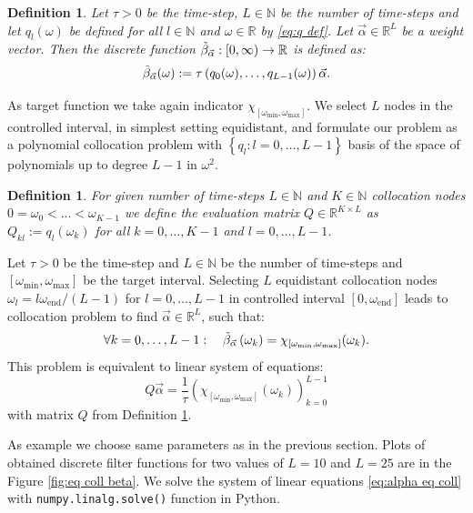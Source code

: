 \documentclass[a4paper,11pt,bibliography=totoc,listof=totoc,headinclude=true,cleardoublepage=empty,oneside]{scrbook}
\newtheorem{definition}[theorem]{Definition}
\newcommand{\R}{\mathbb{R}}
\newcommand{\N}{\mathbb{N}}
\newcommand{\dffv}{\Tilde{\beta}_{\Vec{\alpha}}}
\newcommand{\e}{\mathrm{end}}
\begin{document}
\begin{definition}
    Let $\tau > 0$ be the time-step, $L\in \N$ be the number of time-steps and let $q_l(\omega)$ be defined for all $l \in \N$ and $\omega \in \R$ by \eqref{eq:q def}. Let $\Vec{\alpha}\in\R^L$ be a weight vector. Then the discrete function $\dffv: [0, \infty) \rightarrow \R$ is defined as:
    \begin{equation*}\label{eq:dffv}
        \dffv (\omega) := \tau \left(q_0(\omega), \dots, q_{L-1}(\omega)\right) \Vec{\alpha}. 
    \end{equation*}
\end{definition}

As target function we take again indicator $\chi_{\left[\omega_{\min}, \omega_{\max}\right]}$. We select $L$ nodes in the controlled interval, in simplest setting equidistant, and formulate our problem as a polynomial collocation problem with $\left\{q_l : l=0, \dots, L-1\right\}$ basis of the space of polynomials up to degree $L-1$ in $\omega^2$.
\begin{definition}\label{def:evaluation matrix}
    For given number of time-steps $L\in \N$ and $K\in \N$ collocation nodes $ 0 = \omega_0 < \dots < \omega_{K-1}$ we define the evaluation matrix $Q \in \R^{K\times L}$ as $Q_{kl} := q_l\left(\omega_k\right)$ for all $k=0, \dots, K-1$ and $l=0, \dots, L-1$. 
\end{definition}

Let $\tau>0$ be the time-step and $L\in \N$ be the number of time-steps and $\left[\omega_{\min}, \omega_{\max}\right]$ be the target interval. Selecting $L$ equidistant collocation nodes $\omega_l = l\omega_\e/ (L-1)$ for $l=0, \dots, L-1$ in controlled interval $\left[0, \omega_{\e}\right]$ leads to collocation problem to find $\Vec{\alpha} \in \R^L$, such that:
\begin{equation*}
    \forall k = 0, \dots, L-1: \quad \dffv\left(\omega_k\right) = \chi_{\left[\omega_{\min}, \omega_{\max}\right]}(\omega_k).
\end{equation*}
This problem is equivalent to linear system of equations:
\begin{equation}\label{eq:alpha eq coll}
     Q \Vec{\alpha} = \frac{1}{\tau} \left(\chi_{\left[\omega_{\min}, \omega_{\max}\right]}(\omega_k) \right)_{k=0}^{L-1}
\end{equation}
with matrix $Q$ from Definition \ref{def:evaluation matrix}.

As example we choose same parameters as in the previous section. Plots of obtained discrete filter functions for two values of $L = 10 $ and $L=25$ are in the Figure \ref{fig:eq coll beta}. We solve the system of linear equations \eqref{eq:alpha eq coll} with \texttt{numpy.linalg.solve()} function in Python. 
\end{document}
